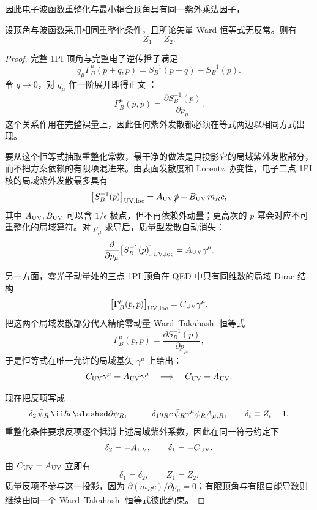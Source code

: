 因此电子波函数重整化与最小耦合顶角具有同一紫外乘法因子，


\begin{proposition}
设顶角与波函数采用相同重整化条件，且所论矢量 Ward 恒等式无反常。则有
\begin{equation}
{Z_1=Z_2.}
\label{eq:qed_ward_z1_equals_z2}
\end{equation}
\end{proposition}
\begin{proof}
完整 1PI 顶角与完整电子逆传播子满足
\[
q_\mu\Gamma_B^\mu(p+q,p)
=
S_B^{-1}(p+q)-S_B^{-1}(p).
\]
令 \(q\to0\)，对 \(q_\mu\) 作一阶展开即得正文
：
\[
\Gamma_B^\mu(p,p)
=
\frac{\partial S_B^{-1}(p)}{\partial p_\mu}.
\]
这个关系作用在完整裸量上，因此任何紫外发散都必须在等式两边以相同方式出现。

要从这个恒等式抽取重整化常数，最干净的做法是只投影它的局域紫外发散部分，而不把方案依赖的有限项混进来。由表面发散度和 Lorentz 协变性，电子二点 1PI 核的局域紫外发散最多具有
\begin{equation*}
 \bigl[S_B^{-1}(p)\bigr]_{\rm UV,loc}
 =A_{\rm UV}\,\slashed p
 +B_{\rm UV}\,m_Rc,
\end{equation*}
其中 $A_{\rm UV},B_{\rm UV}$ 可以含 $1/\epsilon$ 极点，但不再依赖外动量；更高次的 $p$ 幂会对应不可重整化的局域算符。对 $p_\mu$ 求导后，质量型发散自动消失：
\begin{equation*}
 \frac{\partial}{\partial p_\mu}
 \bigl[S_B^{-1}(p)\bigr]_{\rm UV,loc}
 =A_{\rm UV}\gamma^\mu.
\end{equation*}

另一方面，零光子动量处的三点 1PI 顶角在 QED 中只有同维数的局域 Dirac 结构
\begin{equation*}
 \bigl[\Gamma_B^\mu(p,p)\bigr]_{\rm UV,loc}
 =C_{\rm UV}\gamma^\mu.
\end{equation*}
把这两个局域发散部分代入精确零动量 Ward--Takahashi 恒等式
\begin{equation*}
 \Gamma_B^\mu(p,p)
 =\frac{\partial S_B^{-1}(p)}{\partial p_\mu},
\end{equation*}
于是恒等式在唯一允许的局域基矢 $\gamma^\mu$ 上给出：
\begin{equation*}
 C_{\rm UV}\gamma^\mu=A_{\rm UV}\gamma^\mu
 \quad\Longrightarrow\quad
 C_{\rm UV}=A_{\rm UV}.
\end{equation*}

现在把反项写成
\begin{equation*}
 \delta_2\,\bar\psi_R\,\ii\hbar c\slashed\partial\psi_R,
 \qquad
 -\delta_1 q_Rc\,\bar\psi_R\gamma^\mu\psi_R A_{\mu,R},
 \qquad
 \delta_i\equiv Z_i-1.
\end{equation*}
重整化条件要求反项逐个抵消上述局域紫外系数，因此在同一符号约定下
\begin{equation*}
 \delta_2=-A_{\rm UV},
 \qquad
 \delta_1=-C_{\rm UV}.
\end{equation*}
由 $C_{\rm UV}=A_{\rm UV}$ 立即有
\begin{equation*}
 \delta_1=\delta_2,
 \qquad
 {Z_1=Z_2.}
\end{equation*}
质量反项不参与这一投影，因为 $\partial(m_Rc)/\partial p_\mu=0$；有限顶角与有限自能导数则继续由同一个 Ward--Takahashi 恒等式彼此约束。


\end{proof}
